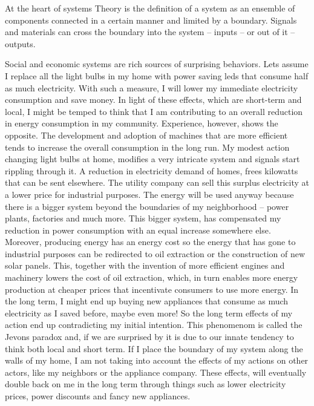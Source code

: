 \documentclass{tufte-book} %
\begin{document}
At the heart of systems Theory is the definition of a system as an ensemble of components connected in a certain manner and limited by a boundary. Signals and materials can cross the boundary into the system -- inputs -- or out of it -- outputs.

Social and economic systems are  rich sources of surprising behaviors. Lets assume I replace all the light bulbs in my home with power saving leds that consume half as much electricity. With such a measure, I will  lower my immediate electricity consumption and save money. In light of these effects, which are short-term and local, I might be temped to think that I am contributing to an overall reduction in energy consumption in my community. Experience, however, shows the opposite. The development and adoption of machines that are more efficient tends to increase the overall consumption in the long run. My modest action changing light bulbs at home, modifies a very intricate system and signals start rippling through it. A reduction in electricity demand of homes, frees kilowatts that can be sent elsewhere. The utility company can sell this surplus electricity at a lower price for industrial purposes. The energy will be used anyway because there is a bigger system beyond the boundaries of my neighborhood -- power plants, factories and much more. This bigger system, has compensated my reduction in power consumption with an equal increase somewhere else. Moreover, producing energy has an energy cost so the energy that has gone to industrial purposes can be redirected to oil extraction or the construction of new solar panels. This, together with the invention of more efficient engines and machinery lowers the cost of oil extraction, which, in turn enables more energy production at cheaper prices that incentivate consumers to use more energy. In the long term, I might end up  buying new appliances that consume as much electricity as I saved before, maybe even more! So the long term effects of my action end up contradicting my initial intention. This phenomenom is called the Jevons paradox and, if we are surprised by it is due to our innate tendency to think both local and short term. If I place the boundary of my system along the walls of my home, I am not taking into account the effects of my actions on other actors, like my neighbors or the appliance company. These effects, will eventually double back on me in the long term through things such as lower electricity prices, power discounts and fancy new appliances.
\end{document}

